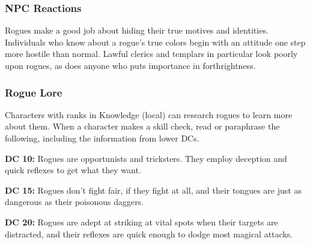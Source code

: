 \subsubsection{NPC Reactions}
Rogues make a good job about hiding their true motives and identities. Individuals who know about a rogue's true colors begin with an attitude one step more hostile than normal. Lawful clerics and templars in particular look poorly upon rogues, as does anyone who puts importance in forthrightness.

\subsubsection{Rogue Lore}
Characters with ranks in Knowledge (local) can research rogues to learn more about them. When a character makes a skill check, read or paraphrase the following, including the information from lower DCs.

\textbf{DC 10:} Rogues are opportunists and tricksters. They employ deception and quick reflexes to get what they want.

\textbf{DC 15:} Rogues don't fight fair, if they fight at all, and their tongues are just as dangerous as their poisonous daggers.

\textbf{DC 20:} Rogues are adept at striking at vital spots when their targets are distracted, and their reflexes are quick enough to dodge most magical attacks.